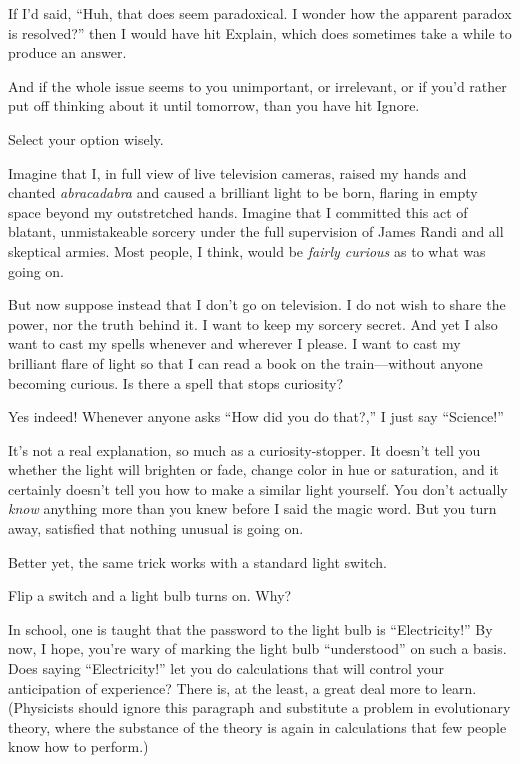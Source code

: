 {
 If I'd said, ``Huh, that does
seem paradoxical. I wonder how the apparent paradox is
resolved?'' then I would have hit Explain, which does
sometimes take a while to produce an answer.}

{
 And if the whole issue seems to you unimportant, or irrelevant, or
if you'd rather put off thinking about it until
tomorrow, than you have hit Ignore.}

{
 Select your option wisely.}

\myendsectiontext


{
 Imagine that I, in full view of live television cameras, raised my
hands and chanted \textit{abracadabra} and caused a brilliant light to
be born, flaring in empty space beyond my outstretched hands. Imagine
that I committed this act of blatant, unmistakeable sorcery under the
full supervision of James Randi and all skeptical armies. Most people,
I think, would be \textit{fairly curious} as to what was going on. }

{
 But now suppose instead that I don't go on
television. I do not wish to share the power, nor the truth behind it.
I want to keep my sorcery secret. And yet I also want to cast my spells
whenever and wherever I please. I want to cast my brilliant flare of
light so that I can read a book on the train---without anyone becoming
curious. Is there a spell that stops curiosity?}

{
 Yes indeed! Whenever anyone asks ``How did you do
that?,'' I just say
``Science!''}

{
 It's not a real explanation, so much as a
curiosity-stopper. It doesn't tell you whether the
light will brighten or fade, change color in hue or saturation, and it
certainly doesn't tell you how to make a similar light
yourself. You don't actually \textit{know} anything
more than you knew before I said the magic word. But you turn away,
satisfied that nothing unusual is going on.}

{
 Better yet, the same trick works with a standard light switch.}

{
 Flip a switch and a light bulb turns on. Why?}

{
 In school, one is taught that the password to the light bulb is
``Electricity!'' By now, I hope,
you're wary of marking the light bulb
``understood'' on such a basis. Does
saying ``Electricity!'' let you do
calculations that will control your anticipation of experience? There
is, at the least, a great deal more to learn. (Physicists should ignore
this paragraph and substitute a problem in evolutionary theory, where
the substance of the theory is again in calculations that few people
know how to perform.)}

